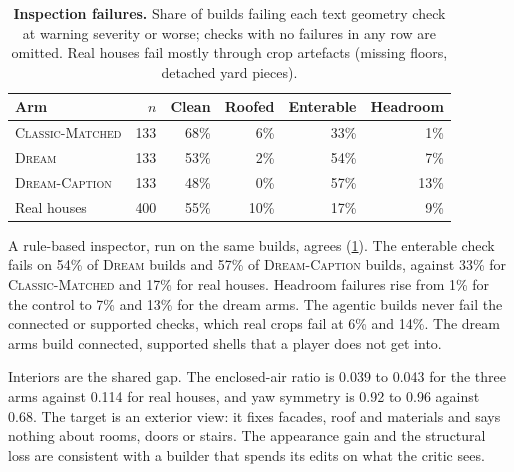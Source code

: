 \begin{table}[t]
\centering
\footnotesize
\setlength{\tabcolsep}{3pt}
\caption{\textbf{Inspection failures.} Share of builds failing each text geometry check at warning severity or worse; checks with no failures in any row are omitted. Real houses fail mostly through crop artefacts (missing floors, detached yard pieces).}
\label{tab:inspect}
\begin{tabular}{@{}lrrrrr@{}}
\toprule
Arm & $n$ & Clean & Roofed & Enterable & Headroom \\
\midrule
\textsc{Classic-Matched} & 133 & 68\% & 6\% & 33\% & 1\% \\
\textsc{Dream} & 133 & 53\% & 2\% & 54\% & 7\% \\
\textsc{Dream-Caption} & 133 & 48\% & 0\% & 57\% & 13\% \\
Real houses & 400 & 55\% & 10\% & 17\% & 9\% \\
\bottomrule
\end{tabular}
\end{table}

A rule-based inspector, run on the same builds, agrees (\cref{tab:inspect}). %
The enterable check fails on 54\% of \textsc{Dream} builds and 57\% of \textsc{Dream-Caption} builds, against 33\% for \textsc{Classic-Matched} and 17\% for real houses. %
Headroom failures rise from 1\% for the control to 7\% and 13\% for the dream arms. %
The agentic builds never fail the connected or supported checks, which real crops fail at 6\% and 14\%. %
The dream arms build connected, supported shells that a player does not get into.

Interiors are the shared gap. %
The enclosed-air ratio is 0.039 to 0.043 for the three arms against 0.114 for real houses, and yaw symmetry is 0.92 to 0.96 against 0.68. %
The target is an exterior view: it fixes facades, roof and materials and says nothing about rooms, doors or stairs. %
The appearance gain and the structural loss are consistent with a builder that spends its edits on what the critic sees.

